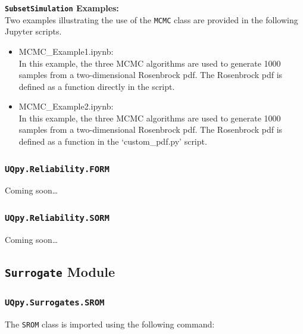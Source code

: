 \noindent\textbf{\texttt{SubsetSimulation} Examples:}\\
\noindent Two examples illustrating the use of the \texttt{MCMC} class are provided in the following Jupyter scripts.
\begin{itemize}
\item MCMC\_Example1.ipynb:\\
	In this example, the three MCMC algorithms are used to generate 1000 samples from a two-dimensional Rosenbrock pdf. The Rosenbrock pdf is defined as a function directly in the 	script.
\item MCMC\_Example2.ipynb:\\
	In this example, the three MCMC algorithms are used to generate 1000 samples from a two-dimensional Rosenbrock pdf. The Rosenbrock pdf is defined as a function in the 			`custom\_pdf.py' script.
\end{itemize}



\subsubsection{\texttt{UQpy.Reliability.FORM}}

Coming soon\dots


\subsubsection{\texttt{UQpy.Reliability.SORM}}

Coming soon\dots


\subsection{\texttt{Surrogate} Module}


\subsubsection{\texttt{UQpy.Surrogates.SROM}}

The \texttt{SROM} class is imported using the following command:

